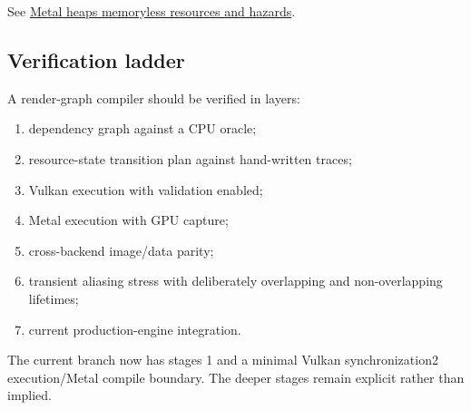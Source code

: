 See \hyperref[appendix-563b2cb23fc3]{Metal heaps memoryless resources and hazards}.

\subsection{Verification ladder}\label{appendix-0fc95374cb7e-verification-ladder}

A render-graph compiler should be verified in layers:

\begin{enumerate}
\def\labelenumi{\arabic{enumi}.}
\tightlist
\item
  dependency graph against a CPU oracle;
\item
  resource-state transition plan against hand-written traces;
\item
  Vulkan execution with validation enabled;
\item
  Metal execution with GPU capture;
\item
  cross-backend image/data parity;
\item
  transient aliasing stress with deliberately overlapping and non-overlapping lifetimes;
\item
  current production-engine integration.
\end{enumerate}

The current branch now has stages 1 and a minimal Vulkan synchronization2 execution/Metal compile boundary. The deeper stages remain explicit rather than implied.
